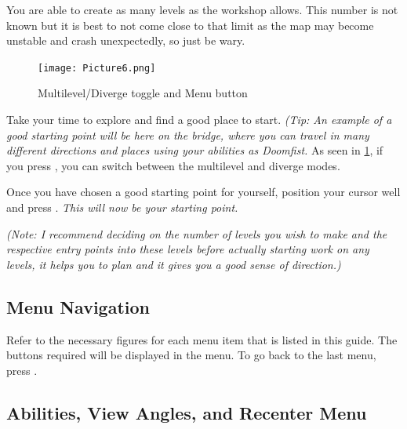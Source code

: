\documentclass[12pt,a4paper]{article}
\begin{document}
        You are able to create as many levels as the workshop allows. This number is not known but it is best to not come close to that limit as the map may become unstable and crash unexpectedly, so just be wary.
        
        \begin{figure}[ht]
            \centering
            \texttt{[image: Picture6.png]}
            \caption{Multilevel/Diverge toggle and Menu button}
            \label{fig:Picture6}
        \end{figure}
        
        Take your time to explore and find a good place to start. \textit{(Tip: An example of a good starting point will be here on the bridge, where you can travel in many different directions and places using your abilities as Doomfist.} As seen in \cref{fig:Picture6}, if you press , you can switch between the multilevel and diverge modes.
        
        Once you have chosen a good starting point for yourself, position your cursor well and press . \emph{This will now be your starting point.}

        \textit{(Note: I recommend deciding on the number of levels you wish to make and the respective entry 
            points into these levels before actually starting work on any levels, it helps you to plan and it 
            gives you a good sense of direction.)}  
    
    \subsection{Menu Navigation}
        Refer to the necessary figures for each menu item that is listed in this guide. The buttons required will be displayed in the menu. To go back to the last menu, press . 
    
    \subsection{Abilities, View Angles, and Recenter Menu}
\end{document}
